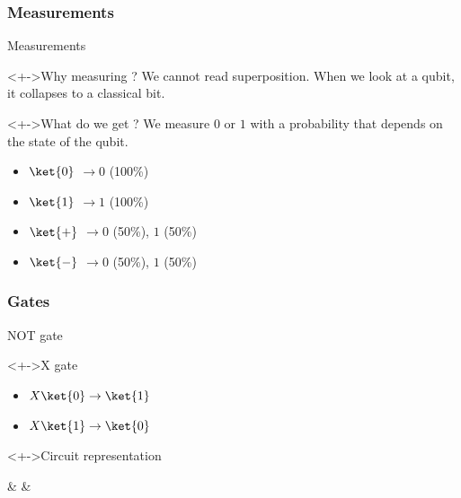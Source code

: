 \documentclass{beamer}
\begin{document}
\subsubsection*{Measurements}
\begin{frame}{Measurements}
	\begin{linenumbers}
		\begin{block}<+->{Why measuring ?}
			We cannot read superposition. When we look at a qubit, it collapses to a classical bit.
		\end{block}
		\begin{block}<+->{What do we get ?}
			We measure $0$ or $1$ with a probability that depends on the state of the qubit.
			\begin{itemize}[<+->]
				\item $\ket{0}$ $\rightarrow 0$ (100\%)
				\item $\ket{1}$ $\rightarrow 1$ (100\%)
				\item $\ket{+}$ $\rightarrow 0$ (50\%), $1$ (50\%)
				\item $\ket{-}$ $\rightarrow 0$ (50\%), $1$ (50\%)
			\end{itemize}
		\end{block}
	\end{linenumbers}
\end{frame}

\subsubsection*{Gates}
\begin{frame}{NOT gate}
\begin{linenumbers}
    \begin{block}<+->{X gate}
			\begin{itemize}
					\item $X\ket{0} \rightarrow \ket{1}$
					\item $X\ket{1} \rightarrow \ket{0}$
			\end{itemize}
		\end{block}
		\begin{block}<+->{Circuit representation}
			\centering
			\begin{quantikz}
				\lstick{$\ket{\psi}$} &  & \meter{}
			\end{quantikz}
    \end{block}
\end{linenumbers}
\end{frame}
\end{document}
